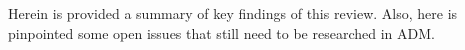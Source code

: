 Herein is provided a summary of key findings of this review. Also, here is pinpointed some open issues that still need to be researched in ADM.